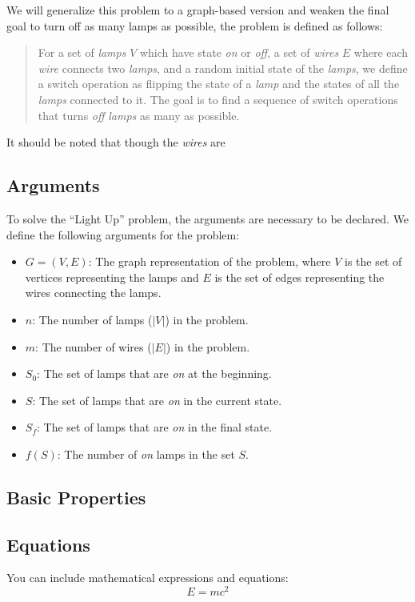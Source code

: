 \documentclass[11pt]{article}
\begin{document}
We will generalize this problem to a graph-based version and weaken the final goal to turn off as many lamps as possible, the problem is defined as follows:
\begin{quote}
        For a set of \textit{lamps} $V$ which have state \textit{on} or \textit{off}, a set of \textit{wires} $E$ where each \textit{wire} connects two \textit{lamps}, and a random initial state of the \textit{lamps}, we define a switch operation as flipping the state of a \textit{lamp} and the states of all the \textit{lamps} connected to it. The goal is to find a sequence of switch operations that turns \textit{off} \textit{lamps} as many as possible.
\end{quote}

It should be noted that though the \textit{wires} are 
\subsection{Arguments}
To solve the ``Light Up'' problem, the arguments are necessary to be declared. We define the following arguments for the problem:
\begin{itemize}
    \item $G = (V, E)$: The graph representation of the problem, where $V$ is the set of vertices representing the lamps and $E$ is the set of edges representing the wires connecting the lamps.
    \item $n$: The number of lamps ($|V|$) in the problem.
    \item $m$: The number of wires ($|E|$) in the problem.
    \item $S_0$: The set of lamps that are \textit{on} at the beginning.
    \item $S$: The set of lamps that are \textit{on} in the current state.
    \item $S_f$: The set of lamps that are \textit{on} in the final state.
    \item $f(S)$: The number of \textit{on} lamps in the set $S$.
\end{itemize}

\subsection{Basic Properties}





\subsection{Equations}
You can include mathematical expressions and equations:
\begin{equation}
    E = mc^2
\end{equation}
\end{document}
